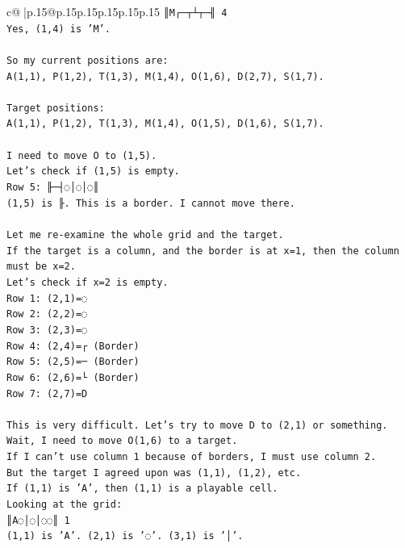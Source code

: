 \documentclass{article}
\begin{document}
{\begin{supertabular}{c@{$\;$}|p{.15\linewidth}@{}p{.15\linewidth}p{.15\linewidth}p{.15\linewidth}p{.15\linewidth}p{.15\linewidth}}
{{{\texttt{║M┌─┬┴┬─╢ 4} \\
\texttt{Yes, (1,4) is 'M'.} \\
\\ 
\texttt{So my current positions are:} \\
\texttt{A(1,1), P(1,2), T(1,3), M(1,4), O(1,6), D(2,7), S(1,7).} \\
\\ 
\texttt{Target positions:} \\
\texttt{A(1,1), P(1,2), T(1,3), M(1,4), O(1,5), D(1,6), S(1,7).} \\
\\ 
\texttt{I need to move O to (1,5).} \\
\texttt{Let's check if (1,5) is empty.} \\
\texttt{Row 5: ╟─┤◌│◌│◌║} \\
\texttt{(1,5) is ╟. This is a border. I cannot move there.} \\
\\ 
\texttt{Let me re{-}examine the whole grid and the target.} \\
\texttt{If the target is a column, and the border is at x=1, then the column must be x=2.} \\
\texttt{Let's check if x=2 is empty.} \\
\texttt{Row 1: (2,1)=◌} \\
\texttt{Row 2: (2,2)=◌} \\
\texttt{Row 3: (2,3)=◌} \\
\texttt{Row 4: (2,4)=┌ (Border)} \\
\texttt{Row 5: (2,5)=─ (Border)} \\
\texttt{Row 6: (2,6)=└ (Border)} \\
\texttt{Row 7: (2,7)=D} \\
\\ 
\texttt{This is very difficult. Let's try to move D to (2,1) or something.} \\
\texttt{Wait, I need to move O(1,6) to a target.} \\
\texttt{If I can't use column 1 because of borders, I must use column 2.} \\
\texttt{But the target I agreed upon was (1,1), (1,2), etc.} \\
\texttt{If (1,1) is 'A', then (1,1) is a playable cell.} \\
\texttt{Looking at the grid:} \\
\texttt{║A◌│◌│◌◌║ 1} \\
\texttt{(1,1) is 'A'. (2,1) is '◌'. (3,1) is '│'.} \\
}}}
\end{supertabular}}
\end{document}
